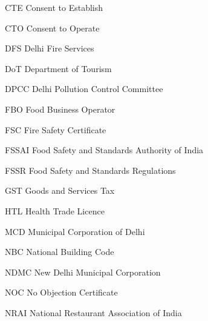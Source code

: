 \documentclass[a4paper, 12pt]{article}
\begin{document}
        
        \begin{abbrv}        
        
 		\item[CTE]		Consent to Establish
 		\item[CTO]		Consent to Operate
 		\item[DFS]		Delhi Fire Services
 		\item[DoT]			Department of Tourism
 		\item[DPCC]		Delhi Pollution Control Committee
 		\item[FBO]		Food Business Operator
 		\item[FSC]		Fire Safety Certificate
		\item[FSSAI]		Food Safety and Standards Authority of India 
 		\item[FSSR]		Food Safety and Standards Regulations
 		\item[GST]		Goods and Services Tax
 		\item[HTL]			Health Trade Licence
 		\item[MCD]		Municipal Corporation of Delhi
 		\item[NBC]		National Building Code
 		\item[NDMC]		New Delhi Municipal Corporation
 		\item[NOC	]		No Objection Certificate
 		\item[NRAI]		National Restaurant Association of India  
               \end{abbrv}


        
		
\end{document}
